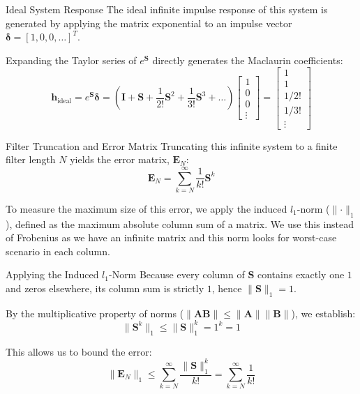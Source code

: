 \documentclass{beamer}
\providecommand{\norm}[1]{\lVert#1\rVert}
\numberwithin{equation}{section}
\begin{document}
\begin{frame}{Ideal System Response}
The ideal infinite impulse response of this system is generated by applying the matrix exponential to an impulse vector $\mathbf{\delta} = [1, 0, 0, \dots]^T$.
\vspace{0.5cm}

Expanding the Taylor series of $e^{\mathbf{S}}$ directly generates the Maclaurin coefficients:
\begin{equation}
    \mathbf{h}_{\text{ideal}} = e^{\mathbf{S}} \mathbf{\delta} = \left( \mathbf{I} + \mathbf{S} + \frac{1}{2!} \mathbf{S}^2 + \frac{1}{3!} \mathbf{S}^3 + \dots \right) \begin{bmatrix} 1 \\ 0 \\ 0 \\ \vdots \end{bmatrix} = \begin{bmatrix} 1 \\ 1 \\ 1/2! \\ 1/3! \\ \vdots \end{bmatrix}
\end{equation}
\end{frame}

\begin{frame}{Filter Truncation and Error Matrix}
Truncating this infinite system to a finite filter length $N$ yields the error matrix, $\mathbf{E}_N$:
\begin{equation}
    \mathbf{E}_N = \sum_{k=N}^{\infty} \frac{1}{k!} \mathbf{S}^k
\end{equation}
\vspace{0.3cm}

To measure the maximum size of this error, we apply the induced $l_1$-norm ($\norm{\cdot}_1$), defined as the maximum absolute column sum of a matrix. We use this instead of Frobenius as we have an infinite matrix and this norm looks for worst-case scenario in each column.
\end{frame}

\begin{frame}{Applying the Induced $l_1$-Norm}
Because every column of $\mathbf{S}$ contains exactly one $1$ and zeros elsewhere, its column sum is strictly $1$, hence $\norm{\mathbf{S}}_1 = 1$.
\vspace{0.3cm}

By the multiplicative property of norms ($\norm{\mathbf{A}\mathbf{B}} \le \norm{\mathbf{A}}\norm{\mathbf{B}}$), we establish:
\begin{equation}
    \norm{\mathbf{S}^k}_1 \le \norm{\mathbf{S}}_1^k = 1^k = 1
\end{equation}

This allows us to bound the error:
\begin{equation}
    \norm{\mathbf{E}_N}_1 \le \sum_{k=N}^{\infty} \frac{\norm{\mathbf{S}}_1^k}{k!} = \sum_{k=N}^{\infty} \frac{1}{k!}
\end{equation}
\end{frame}
\end{document}
